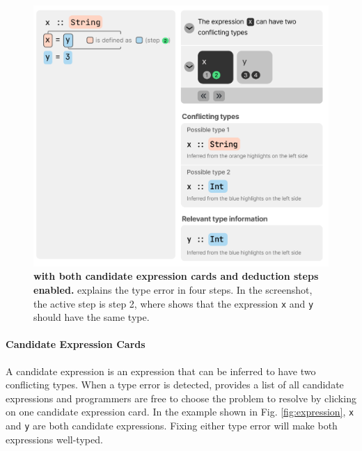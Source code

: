 \begin{figure}
    \centering
    \includegraphics[width=\linewidth, trim=0mm 10mm 0mm 0mm]{images/intro-deduction.pdf}
    \caption{
        \textbf{\chameleon{} with both candidate expression cards and deduction steps
        enabled.}
        \chameleon{} explains the type error in four steps. In the screenshot, the active step is step 2, where \chameleon{} shows that the expression \texttt{x} and \texttt{y} should have the same type. 
    }
    \label{fig:deduction}
\end{figure}



\paragraph{Candidate Expression Cards}  \label{sub:candidate-expression}


A candidate expression is an expression that can be inferred to have two conflicting types. 
When a type error is detected, \chameleon{} provides a list of all candidate expressions and programmers are free to choose the problem to resolve by clicking on one candidate expression card. In the example shown in Fig. \ref{fig:expression}, \texttt{x} and \texttt{y} are both candidate expressions. Fixing either type error will make both expressions well-typed.



